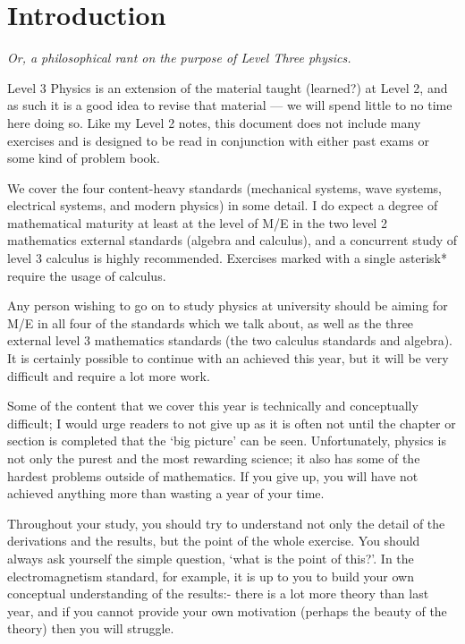 \documentclass[a4paper]{amsbook}
\newcommand{\marginsymbol}{}
\theoremstyle{definition}
\numberwithin{exercise}{chapter}
\numberwithin{exercise}{chapter}
\begin{document}
\setcounter{page}{6}

\tableofcontents

\chapter*{Introduction}
\begin{center}
  \emph{Or, a philosophical rant on the purpose of Level Three physics.}
\end{center}
Level 3 Physics is an extension of the material taught (learned?) at Level 2, and as such it
is a good idea to revise that material --- we will spend little to no time here doing so. Like
my Level 2 notes, this document does not include many exercises and is designed to be read in
conjunction with either past exams or some kind of problem book.

We cover the four content-heavy standards (mechanical systems, wave systems, electrical systems,
and modern physics) in some detail. I do expect a degree of mathematical maturity at least at the
level of M/E in the two level 2 mathematics external standards (algebra and calculus), and a concurrent
study of level 3 calculus is highly recommended. Exercises marked with a single asterisk* require
the usage of calculus.

Any person wishing to go on to study physics at university should be aiming for M/E in all four of
the standards which we talk about, as well as the three external level 3 mathematics standards (the two
calculus standards and algebra). It is certainly possible to continue with an achieved this year, but
it will be very difficult and require a lot more work.

Some of the content that we cover this year is technically and conceptually difficult; I would urge
readers to not give up as it is often not until the chapter or section is completed that the `big
picture' can be seen. Unfortunately, physics is not only the purest and the most rewarding science;
it also has some of the hardest problems outside of mathematics. If you give up, you will have not
achieved anything more than wasting a year of your time.

\marginsymbol Throughout your study, you should try to understand not only the detail of the derivations and the results,
but the point of the whole exercise. You should always ask yourself the simple question, `what is the point
of this?'. In the electromagnetism standard, for example, it is up to you to build your own conceptual
understanding of the results:- there is a lot more theory than last year, and if you cannot provide your
own motivation (perhaps the beauty of the theory) then you will struggle.
\end{document}
